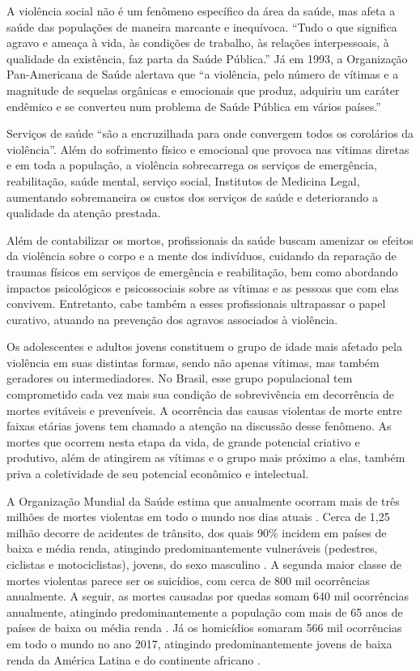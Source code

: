 A violência social não é um fenômeno específico da área da saúde, mas afeta a saúde das populações de maneira marcante e inequívoca. “Tudo o que significa agravo e ameaça à vida, às condições de trabalho, às relações interpessoais, à qualidade da existência, faz parta da Saúde Pública.”\citep{minayo1999possivel} Já em 1993, a Organização Pan-Americana de Saúde alertava que “a violência, pelo número de vítimas e a magnitude de sequelas orgânicas e emocionais que produz, adquiriu um caráter endêmico e se converteu num problema de Saúde Pública em vários países.”\citep{OPASwashington1993}

Serviços de saúde “são a encruzilhada para onde convergem todos os corolários da violência”\citep{OPASwashington1993}. Além do sofrimento físico e emocional que provoca nas vítimas diretas e em toda a população, a violência sobrecarrega os serviços de emergência, reabilitação, saúde mental, serviço social, Institutos de Medicina Legal, aumentando sobremaneira os custos dos serviços de saúde e deteriorando a qualidade da atenção prestada. 

Além de contabilizar os mortos, profissionais da saúde buscam amenizar os efeitos da violência sobre o corpo e a mente dos indivíduos, cuidando da reparação de traumas físicos em serviços de emergência e reabilitação, bem como abordando impactos psicológicos e psicossociais sobre as vítimas e as pessoas que com elas convivem. Entretanto, cabe também a esses profissionais ultrapassar o papel curativo, atuando na prevenção dos agravos associados à violência.

Os adolescentes e adultos jovens constituem o grupo de idade mais afetado pela violência em suas distintas formas, sendo não apenas vítimas, mas também geradores ou intermediadores. No Brasil, esse grupo populacional tem comprometido cada vez mais sua condição de sobrevivência em decorrência de mortes evitáveis e preveníveis. A ocorrência das causas violentas de morte entre faixas etárias jovens tem chamado a atenção na discussão desse fenômeno. As mortes que ocorrem nesta etapa da vida, de grande potencial criativo e produtivo, além de atingirem as vítimas e o grupo mais próximo a elas, também priva a coletividade de seu potencial econômico e intelectual.

A Organização Mundial da Saúde estima que anualmente ocorram mais de três milhões de mortes violentas em todo o mundo nos dias atuais \citep{world2018world}. Cerca de 1,25 milhão decorre de acidentes de trânsito, dos quais 90\% incidem em países de baixa e média renda, atingindo predominantemente vulneráveis (pedestres, ciclistas e motociclistas), jovens, do sexo masculino \citep{Who2018road}. A segunda maior classe de mortes violentas parece ser os suicídios, com cerca de 800 mil ocorrências anualmente\citep{WHO2019suicide}. A seguir, as mortes causadas por quedas somam 640 mil ocorrências anualmente, atingindo predominantemente a população com mais de 65 anos de países de baixa ou média renda \citep{who2018falls}. Já os homicídios somaram 566 mil ocorrências em todo o mundo no ano 2017, atingindo predominantemente jovens de baixa renda da América Latina e do continente africano \citep{mc2017global}.


